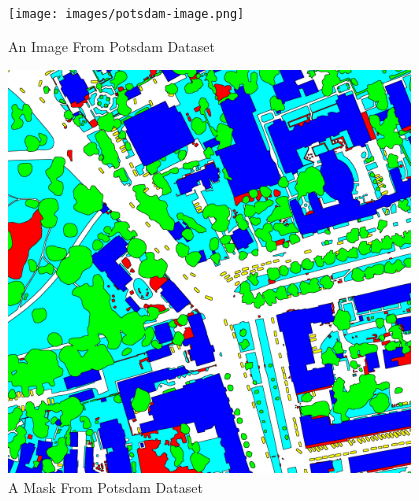 \begin{figure}[!htb]
    \centering
    \begin{minipage}{0.5\textwidth}
        \centering
        \texttt{[image: images/potsdam-image.png]}
        \caption{An Image From Potsdam Dataset \protect\cite{potsdam-vaihingen}}
        \label{fig:potsdam-image}
    \end{minipage}\hfill
    \begin{minipage}{0.5\textwidth}
        \centering
        \includegraphics[width=0.95\textwidth, height=0.35\textheight]{images/potsdam-mask.png}
        \caption{A Mask From Potsdam Dataset \protect\cite{potsdam-vaihingen}}
        \label{fig:potsdam-mask}
    \end{minipage}
\end{figure}

